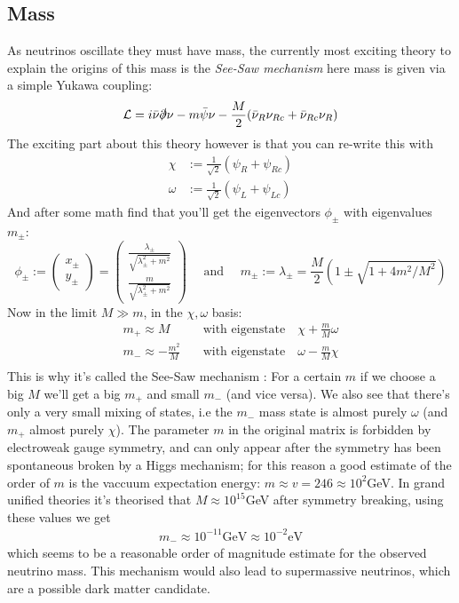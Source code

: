 \documentclass[11pt,a4paper,faculty=we,language=en,doctype=report]{cls/ugent-doc}
\begin{document}
\subsection{Mass}
As neutrinos oscillate they must have mass, the currently most exciting theory to 
explain the origins of this mass is the \textit{See-Saw mechanism} here mass is given
via a simple Yukawa coupling:
\begin{equation}
	\mathcal{L} = i\bar{\nu}\slashed{\partial}\nu - m\bar{\psi}\nu - \frac{M}{2} (\bar{\nu}_R\nu_{Rc} + \bar{\nu}_{Rc}\nu_R)
\end{equation}
The exciting part about this theory however is that you can re-write this with
\begin{align}
	\chi &:= \frac{1}{\sqrt{2}} (\psi_R + \psi_{Rc})\\
	\omega &:= \frac{1}{\sqrt{2}} (\psi_L + \psi_{Lc})
\end{align}
And after some math find that you'll get the eigenvectors $\phi_\pm$ with eigenvalues $m_\pm$:
\begin{equation}
	\phi_\pm := \left(\begin{array}{c}
		x_\pm\\
		y_\pm
	\end{array}\right) = \left(\begin{array}{c}
		\frac{\lambda_\pm}{\sqrt{\lambda_\pm^2 + m^2}}\\
		\frac{m}{\sqrt{\lambda_\pm^2 + m^2}}
	\end{array}\right) \quad \text{ and }\quad m_\pm := \lambda_\pm =  \frac{M}{2}\left( 1 \pm \sqrt{1 + 4m^2/M^2}\right)
\end{equation}
Now in the limit $M \gg m$, in the $\chi,\omega$ basis:
\begin{align}
	m_+\approx M \quad &\text{with eigenstate} \quad \chi + \frac{m}{M}\omega\\
	m_-\approx -\frac{m^2}{M} \quad &\text{with eigenstate} \quad  \omega - \frac{m}{M}\chi\\
\end{align}
This is why it's called the  See-Saw mechanism : For a certain $m$ if we choose a big $M$ we'll
get a big $m_+$ and small $m_-$ (and vice versa). We also see that there's only
a very small mixing of states, i.e the $m_-$ mass state is almost purely
$\omega$ (and $m_+$ almost purely $\chi$). The parameter $m$ in the original
matrix is forbidden by electroweak gauge symmetry, and can only appear after
the symmetry has been spontaneous broken by a Higgs mechanism; for this reason
a good estimate of the order of $m$ is the vaccuum expectation energy:
$m\approx v = 246 \approx 10^2$GeV. In grand unified theories it's theorised
that $M\approx 10^{15}$GeV after symmetry breaking, using these values we get
\begin{align}
	m_- \approx 10^{-11}\text{GeV} \approx 10^{-2} \text{eV}
\end{align}
which seems \cite{neutrino-mass} to be a reasonable order of magnitude estimate for the observed neutrino
mass.
This mechanism would also lead to supermassive neutrinos, which are a possible dark matter
candidate.
\end{document}
